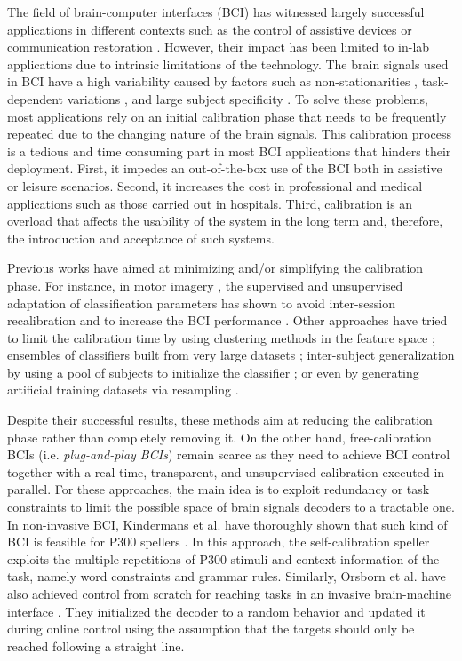 \documentclass[10pt,letterpaper]{article}
\begin{document}
The field of brain-computer interfaces (BCI) has witnessed largely successful applications in different contexts such as the control of assistive devices or communication restoration \cite{millan10}. However, their impact has been limited to in-lab applications due to intrinsic limitations of the technology. The brain signals used in BCI have a high variability caused by factors such as non-stationarities \cite{vidaurre2010towards}, task-dependent variations \cite{Iturrate2013task	}, and large subject specificity \cite{blankertz2010single}. To solve these problems, most applications rely on an initial calibration phase that needs to be frequently repeated due to the changing nature of the brain signals. This calibration process is a tedious and time consuming part in most BCI applications that hinders their deployment. First, it impedes an out-of-the-box use of the BCI both in assistive or leisure scenarios. Second, it increases the cost in professional and medical applications such as those carried out in hospitals. Third,  calibration is an overload that affects the usability of the system in the long term and, therefore, the introduction and acceptance of such systems.

Previous works have aimed at minimizing and/or simplifying the calibration phase. For instance, in motor imagery \cite{millan10}, the supervised and unsupervised adaptation of classification parameters has shown to avoid inter-session recalibration \cite{vidaurre11} and to increase the BCI performance \cite{vidaurre11b}. Other approaches have tried to limit the calibration time by using clustering methods in the feature space \cite{krauledat2006reducing}; ensembles of classifiers built from very large datasets \cite{fazli2009subject}; inter-subject generalization by using a pool of subjects to initialize the classifier \cite{iturrate2011minimizing, faller2012autocalibration, lotte2010learning}; or even by generating artificial training datasets via resampling \cite{lotte:inria-00599325}.

Despite their successful results, these methods aim at reducing the calibration phase rather than completely removing it. On the other hand, free-calibration BCIs (i.e. \textit{plug-and-play BCIs}) remain scarce as they need to achieve BCI control together with a real-time, transparent, and unsupervised calibration executed in parallel. For these approaches, the main idea is to exploit redundancy or task constraints to limit the possible space of brain signals decoders to a tractable one. In non-invasive BCI, Kindermans et al. have thoroughly shown that such kind of BCI is feasible for P300 spellers \cite{Kindermans2012a,kindermans2014true}. In this approach, the self-calibration speller exploits the multiple repetitions of P300 stimuli and context information of the task, namely word constraints and grammar rules. Similarly, Orsborn et al. have also achieved control from scratch for reaching tasks in an invasive brain-machine interface \cite{Orsborn12, orsborn2014closed}. They initialized the decoder to a random behavior and updated it during online control using the assumption that the targets should only be reached following a straight line.
\end{document}
